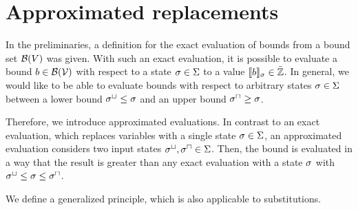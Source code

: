 \section{Approximated replacements}

In the preliminaries, a definition for the exact evaluation of bounds from a bound set $\mathcal{B}(V)$ was given.
With such an exact evaluation, it is possible to evaluate a bound $b \in \mathcal{B}(\mathcal{V})$ with respect to a state $\sigma \in \Sigma$ to a value $\llbracket b \rrbracket_{\sigma} \in \bar{\mathbb{Z}}$.
In general, we would like to be able to evaluate bounds with respect to arbitrary states $\sigma \in \Sigma$ between a lower bound ${\sigma^\sqcup} \leq \sigma$ and an upper bound ${\sigma^\sqcap} \geq \sigma$.

Therefore, we introduce approximated evaluations.
In contrast to an exact evaluation, which replaces variables with a single state $\sigma \in \Sigma$, an approximated evaluation considers two input states ${\sigma^\sqcup}, {\sigma^\sqcap} \in \Sigma$.
Then, the bound is evaluated in a way that the result is greater than any exact evaluation with a state $\sigma$ with ${\sigma^\sqcup} \leq \sigma \leq {\sigma^\sqcap}$.

We define a generalized principle, which is also applicable to substitutions.


